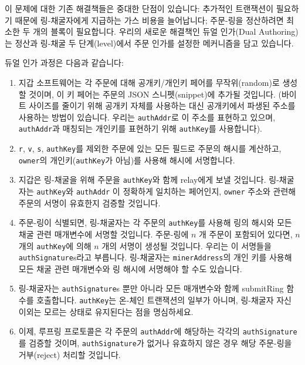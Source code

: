 \documentclass[UTF8,nofonts]{article}
\begin{document}
\begin{multicols}{2}
이 문제에 대한 기존 해결책들은 중대한 단점이 있습니다: 추가적인 트랜잭션이 필요하기 때문에 링-채굴자에게 지급하는 가스 비용을 늘어납니다; 주문-링을 정산하려면 최소한 두 개의 블록이 필요합니다. 우리의 새로운 해결책인 듀얼 인가(Dual Authoring)\cite{dualauthor}는 정산과 링-채굴 두 단계(level)에서 주문 인가를 설정한 메커니즘을 담고 있습니다.

듀얼 인가 과정은 다음과 같습니다:

\begin{enumerate}

	\item 지갑 소프트웨어는 각 주문에 대해 공개키/개인키 페어를 무작위(random)로 생성할 것이며, 이 키 페어는 주문의 JSON 스니펫(snippet)에 추가될 것입니다. (바이트 사이즈를 줄이기 위해 공개키 자체를 사용하는 대신 공개키에서 파생된 주소를 사용하는 방법이 있습니다. 우리는 \verb|authAddr|로 이 주소를 표현하고 있으며, \verb|authAddr|과 매칭되는 개인키를 표현하기 위해 \verb|authKey|를 사용합니다).

	\item \verb|r|, \verb|v|, \verb|s|, \verb|authKey|를 제외한 주문에 있는 모든 필드로 주문의 해시를 계산하고, \verb|owner|의 개인키(\verb|authKey|가 아님)를 사용해 해시에 서명합니다.

	\item 지갑은 링-채굴을 위해 주문을 \verb|authKey|와 함께 relay에게 보낼 것입니다. 링-채굴자는 \verb|authKey|와 \verb|authAddr| 이 정확하게 일치하는 페어인지, \verb|owner| 주소와 관련해 주문의 서명이 유효한지 검증할 것입니다.

	\item 주문-링이 식별되면, 링-채굴자는 각 주문의 \verb|authKey|를 사용해 링의 해시와 모든 채굴 관련 매개변수에 서명할 것입니다. 주문-링에 $n$ 개 주문이 포함되어 있다면, $n$ 개의 \verb|authKey|에 의해 $n$ 개의 서명이 생성될 것입니다. 우리는 이 서명들을 \verb|authSignature|s라고 부릅니다. 링-채굴자는 \verb|minerAddress|의 개인 키를 사용해 모든 채굴 관련 매개변수와 링 해시에 서명해야 할 수도 있습니다.
 
	\item 링-채굴자는 \verb|authSignature|s 뿐만 아니라 모든 매개변수와 함께 submitRing 함수를 호출합니다. \verb|authKey|는 온-체인 트랜잭션의 일부가 아니며, 링-채굴자 자신 이외는 모르는 상태로 유지된다는 점을 명심하세요.

	\item 이제, 루프링 프로토콜은 각 주문의 \verb|authAddr|에 해당하는 각각의 \verb|authSignature|를 검증할 것이며, \verb|authSignature|가 없거나 유효하지 않은 경우 해당 주문-링을 거부(reject) 처리할 것입니다.
 

\end{enumerate}
\end{multicols}
\end{document}
